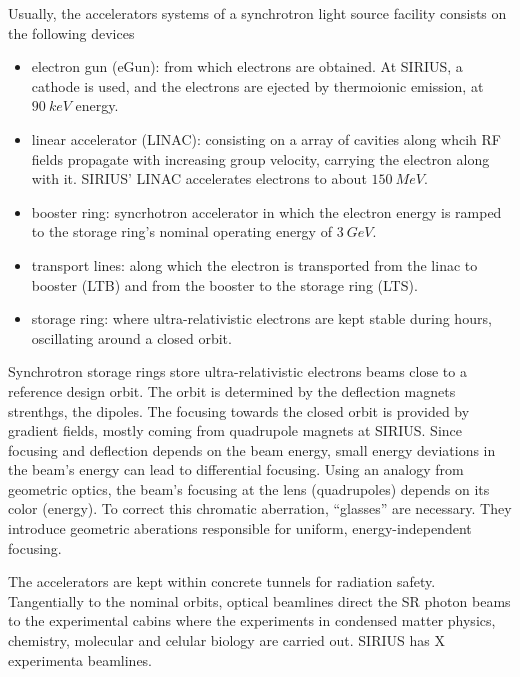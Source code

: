 
Usually, the accelerators systems of a synchrotron light source facility consists on the following devices
\begin{itemize}
    \item electron gun (eGun): from which electrons are obtained. At SIRIUS, a cathode is used, and the electrons are ejected by thermoionic emission, at $90~\unit{keV}$ energy.
    \item linear accelerator (LINAC): consisting on a array of cavities along whcih RF fields propagate with increasing group velocity, carrying the electron along with it. SIRIUS' LINAC accelerates electrons to about $150~\unit{MeV}$.
    \item booster ring: syncrhotron accelerator in which the electron energy is ramped to the storage ring's nominal operating energy of $3~\unit{GeV}$.
    \item transport lines: along which the electron is transported from the linac to booster (LTB) and from the booster to the storage ring (LTS).
    \item storage ring: where ultra-relativistic electrons are kept stable during hours, oscillating around a closed orbit.
\end{itemize}
Synchrotron storage rings store ultra-relativistic electrons beams close to a reference design orbit. The orbit is determined by the deflection magnets strenthgs, the dipoles. The focusing towards the closed orbit is provided by gradient fields, mostly coming from quadrupole magnets at SIRIUS. Since focusing and deflection depends on the beam energy, small energy deviations in the beam's energy can lead to differential focusing. Using an analogy from geometric optics, the beam's focusing at the lens (quadrupoles) depends on its color (energy). To correct this chromatic aberration, ``glasses'' are necessary. They introduce geometric aberations responsible for uniform, energy-independent focusing.

The accelerators  are kept within concrete tunnels for radiation safety. Tangentially to the nominal orbits, optical beamlines direct the SR photon beams to the experimental cabins where the experiments in condensed matter physics, chemistry, molecular and celular biology are carried out. SIRIUS has X experimenta beamlines.





